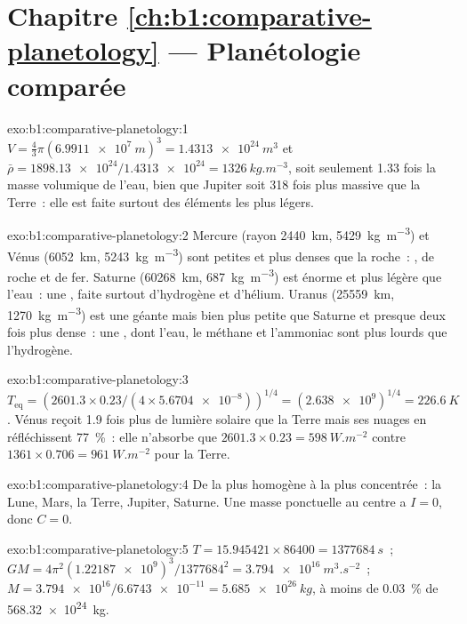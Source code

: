 \section*{Chapitre \ref{ch:b1:comparative-planetology} --- Planétologie comparée}

\begin{solution}{exo:b1:comparative-planetology:1}
$V = \tfrac43\pi(\qty{6.9911e7}{m})^3 = \qty{1.4313e24}{m^3}$ et
$\bar\rho = \num{1898.13e24}/\num{1.4313e24} = \qty{1326}{kg.m^{-3}}$, soit
seulement 1.33 fois la masse volumique de l'eau, bien que Jupiter soit 318 fois
plus massive que la Terre~: elle est faite surtout des éléments les plus légers.
\end{solution}

\begin{solution}{exo:b1:comparative-planetology:2}
Mercure (rayon \qty{2440}{km}, \qty{5429}{kg.m^{-3}}) et Vénus
(\qty{6052}{km}, \qty{5243}{kg.m^{-3}}) sont petites et plus denses que la
roche~: , de roche et de fer. Saturne (\qty{60268}{km},
\qty{687}{kg.m^{-3}}) est énorme et plus légère que l'eau~: une ,
faite surtout d'hydrogène et d'hélium. Uranus (\qty{25559}{km},
\qty{1270}{kg.m^{-3}}) est une géante mais bien plus petite que Saturne et
presque deux fois plus dense~: une , dont l'eau, le méthane et
l'ammoniac sont plus lourds que l'hydrogène.
\end{solution}

\begin{solution}{exo:b1:comparative-planetology:3}
$T_\mathrm{eq} = (2601.3\times0.23/(4\times\num{5.6704e-8}))^{1/4} =
(\num{2.638e9})^{1/4} = \qty{226.6}{K}$. Vénus reçoit 1.9 fois plus de lumière
solaire que la Terre mais ses nuages en réfléchissent \qty{77}{\percent}~:
elle n'absorbe que $2601.3\times0.23 = \qty{598}{W.m^{-2}}$ contre
$1361\times0.706 = \qty{961}{W.m^{-2}}$ pour la Terre.
\end{solution}

\begin{solution}{exo:b1:comparative-planetology:4}
De la plus homogène à la plus concentrée~: la Lune, Mars, la Terre, Jupiter,
Saturne. Une masse ponctuelle au centre a $I = 0$, donc $C = 0$.
\end{solution}

\begin{solution}{exo:b1:comparative-planetology:5}
$T = 15.945421\times86400 = \qty{1377684}{s}$~;
$GM = 4\pi^2(\num{1.22187e9})^3/\num{1377684}^2 = \qty{3.794e16}{m^3.s^{-2}}$~;
$M = \num{3.794e16}/\num{6.6743e-11} = \qty{5.685e26}{kg}$, à moins de
\qty{0.03}{\percent} de \qty{568.32e24}{kg}.
\end{solution}

